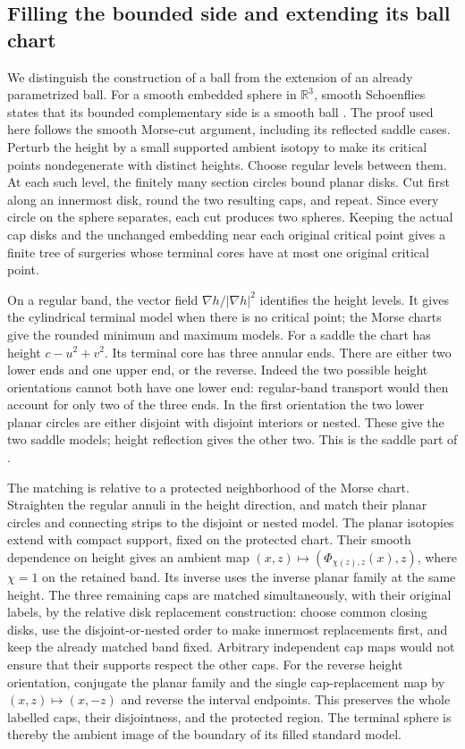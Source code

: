 \subsection{Filling the bounded side and extending its ball chart}
\label{sec:neck-cap-ambient-filling}

We distinguish the construction of a ball from the extension of an already
parametrized ball.  For a smooth embedded sphere in $\mathbb R^3$, smooth
Schoenflies states that its bounded complementary side is a smooth ball
\cite[Theorem 1.1, pp.~1--5]{Hatcher3M2014}.  The proof used here follows
the smooth Morse-cut argument, including its reflected saddle cases.
Perturb the height by a small supported ambient isotopy to make its
critical points nondegenerate with distinct heights.  Choose regular
levels between them.  At each such level, the finitely many section
circles bound planar disks.  Cut first along an innermost disk, round
the two resulting caps, and repeat.  Since every circle on the sphere
separates, each cut produces two spheres.  Keeping the actual cap disks
and the unchanged embedding near each original critical point gives a
finite tree of surgeries whose terminal cores have at most one original
critical point.

On a regular band, the vector field
$\nabla h/|\nabla h|^2$ identifies the height levels.  It gives the
cylindrical terminal model when there is no critical point; the Morse
charts give the rounded minimum and maximum models.  For a saddle the
chart has height $c-u^2+v^2$.  Its terminal core has three annular ends.
There are either two lower ends and one upper end, or the reverse.
Indeed the two possible height orientations cannot both have one lower
end: regular-band transport would then account for only two of the three
ends.  In the first orientation the two lower planar circles are either
disjoint with disjoint interiors or nested.  These give the two saddle
models; height reflection gives the other two.  This is the saddle part
of \cite[Lemma 1.2, pp.~3--4]{Hatcher3M2014}.

The matching is relative to a protected neighborhood of the Morse chart.
Straighten the regular annuli in the height direction, and match their
planar circles and connecting strips to the disjoint or nested model.
The planar isotopies extend with compact support, fixed on the protected
chart.  Their smooth dependence on height gives an ambient map
$(x,z)\mapsto(\Phi_{\chi(z),z}(x),z)$, where $\chi=1$ on the retained
band.  Its inverse uses the inverse planar family at the same height.
The three remaining caps are matched simultaneously, with their original
labels, by the relative disk replacement construction: choose common
closing disks, use the disjoint-or-nested order to make innermost
replacements first, and keep the already matched band fixed.  Arbitrary
independent cap maps would not ensure that their supports respect the
other caps.  For the reverse height orientation, conjugate the planar
family and the single cap-replacement map by
$(x,z)\mapsto(x,-z)$ and reverse the interval endpoints.  This preserves
the whole labelled caps, their disjointness, and the protected region.
The terminal sphere is thereby the ambient image of the boundary of its
filled standard model.

